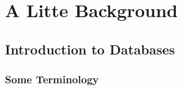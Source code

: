 \chapter{A Litte Background\label{Ch01}}
\section{Introduction to Databases}
\subsection{Some Terminology}
